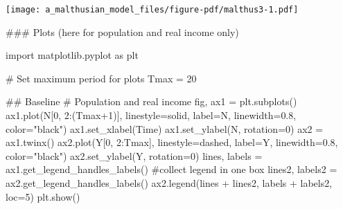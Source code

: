 \documentclass[
  letterpaper,
  DIV=11,
  numbers=noendperiod]{scrreprt}
\newenvironment{Shaded}{\begin{snugshade}}{\end{snugshade}}
\newcommand{\CommentTok}[1]{\textcolor[rgb]{0.37,0.37,0.37}{#1}}
\newcommand{\DecValTok}[1]{\textcolor[rgb]{0.68,0.00,0.00}{#1}}
\newcommand{\FloatTok}[1]{\textcolor[rgb]{0.68,0.00,0.00}{#1}}
\newcommand{\ImportTok}[1]{\textcolor[rgb]{0.00,0.46,0.62}{#1}}
\newcommand{\NormalTok}[1]{\textcolor[rgb]{0.00,0.23,0.31}{#1}}
\newcommand{\OperatorTok}[1]{\textcolor[rgb]{0.37,0.37,0.37}{#1}}
\newcommand{\StringTok}[1]{\textcolor[rgb]{0.13,0.47,0.30}{#1}}
\begin{document}
\texttt{[image: a\_malthusian\_model\_files/figure-pdf/malthus3-1.pdf]}

\begin{tcolorbox}[enhanced jigsaw, titlerule=0mm, breakable, bottomrule=.15mm, toprule=.15mm, colbacktitle=quarto-callout-note-color!10!white, rightrule=.15mm, toptitle=1mm, opacityback=0, left=2mm, coltitle=black, title=\textcolor{quarto-callout-note-color}{\faInfo}\hspace{0.5em}{Python code}, colframe=quarto-callout-note-color-frame, opacitybacktitle=0.6, leftrule=.75mm, bottomtitle=1mm, arc=.35mm, colback=white]

\begin{Shaded}
\begin{Highlighting}[]
\CommentTok{\#\#\# Plots (here for population and real income only)}

\ImportTok{import}\NormalTok{ matplotlib.pyplot }\ImportTok{as}\NormalTok{ plt}

\CommentTok{\# Set maximum period for plots}
\NormalTok{Tmax }\OperatorTok{=} \DecValTok{20}

\CommentTok{\#\# Baseline}
\CommentTok{\# Population and real income}
\NormalTok{fig, ax1 }\OperatorTok{=}\NormalTok{ plt.subplots()}
\NormalTok{ax1.plot(N[}\DecValTok{0}\NormalTok{, }\DecValTok{2}\NormalTok{:(Tmax}\OperatorTok{+}\DecValTok{1}\NormalTok{)], linestyle}\OperatorTok{=}\StringTok{\textquotesingle{}solid\textquotesingle{}}\NormalTok{, label}\OperatorTok{=}\StringTok{\textquotesingle{}N\textquotesingle{}}\NormalTok{, linewidth}\OperatorTok{=}\FloatTok{0.8}\NormalTok{, color}\OperatorTok{=}\StringTok{"black"}\NormalTok{)}
\NormalTok{ax1.set\_xlabel(}\StringTok{\textquotesingle{}Time\textquotesingle{}}\NormalTok{)}
\NormalTok{ax1.set\_ylabel(}\StringTok{\textquotesingle{}N\textquotesingle{}}\NormalTok{, rotation}\OperatorTok{=}\DecValTok{0}\NormalTok{)}
\NormalTok{ax2 }\OperatorTok{=}\NormalTok{ ax1.twinx()}
\NormalTok{ax2.plot(Y[}\DecValTok{0}\NormalTok{, }\DecValTok{2}\NormalTok{:Tmax], linestyle}\OperatorTok{=}\StringTok{\textquotesingle{}dashed\textquotesingle{}}\NormalTok{, label}\OperatorTok{=}\StringTok{\textquotesingle{}Y\textquotesingle{}}\NormalTok{, linewidth}\OperatorTok{=}\FloatTok{0.8}\NormalTok{, color}\OperatorTok{=}\StringTok{"black"}\NormalTok{)}
\NormalTok{ax2.set\_ylabel(}\StringTok{\textquotesingle{}Y\textquotesingle{}}\NormalTok{, rotation}\OperatorTok{=}\DecValTok{0}\NormalTok{)}
\NormalTok{lines, labels }\OperatorTok{=}\NormalTok{ ax1.get\_legend\_handles\_labels() }\CommentTok{\#collect legend in one box}
\NormalTok{lines2, labels2 }\OperatorTok{=}\NormalTok{ ax2.get\_legend\_handles\_labels()}
\NormalTok{ax2.legend(lines }\OperatorTok{+}\NormalTok{ lines2, labels }\OperatorTok{+}\NormalTok{ labels2, loc}\OperatorTok{=}\DecValTok{5}\NormalTok{)}
\NormalTok{plt.show()  }
\end{Highlighting}
\end{Shaded}

\end{tcolorbox}
\end{document}
